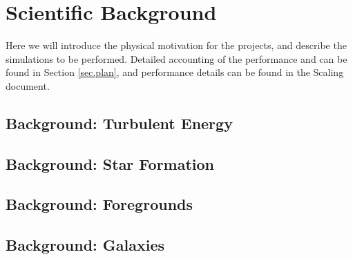 \section{Scientific Background}
\label{sec.background}

Here we will introduce the physical motivation for the projects, and describe
the simulations to be performed.  Detailed accounting of the performance and
can be found in Section \ref{sec.plan}, and performance details can be found in the
Scaling document.


\subsection{Background: Turbulent Energy}
\label{sec.back_turb}



\subsection{Background: Star Formation}
\label{sec.back_cores}



\subsection{Background: Foregrounds}
\label{sec.back_foregrounds}


\subsection{Background: Galaxies}
\label{sec.back_galaxies}


